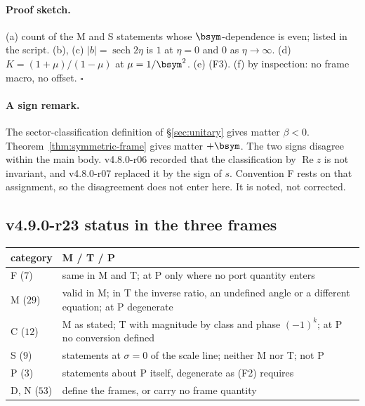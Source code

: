 \paragraph{Proof sketch.}
(a) count of the M and S statements whose \(\bsym\)-dependence is even; listed in the script.  (b), (c) \(|b|=\operatorname{sech}2\eta\) is \(1\) at
\(\eta=0\) and \(0\) as \(\eta\to\infty\).  (d) \(K=(1+\mu)/(1-\mu)\) at \(\mu=1/\bsym^2\).  (e) (F3).  (f) by inspection: no frame macro, no
offset.  \(\square\)

\paragraph{A sign remark.}
The sector-classification definition of \S\ref{sec:unitary} gives matter \(\beta<0\).  Theorem~\ref{thm:symmetric-frame} gives matter
\(+\bsym\).  The two signs disagree within the main body.  v4.8.0-r06 recorded that the classification by \(\operatorname{Re}z\) is not
invariant, and v4.8.0-r07 replaced it by the sign of \(s\).  Convention F rests on that assignment, so the disagreement does not
enter here.  It is noted, not corrected.

\subsection*{v4.9.0-r23 status in the three frames}
\label{subsec:v490-r23-frames}

\begin{center}
\small
\begin{tabular}{@{}>{\raggedright\arraybackslash}p{}>{\raggedright\arraybackslash}p{}@{}}
\toprule
category & M / T / P\\
\midrule
F (\(7\)) & same in M and T; at P only where no port quantity enters\\
M (\(29\)) & valid in M; in T the inverse ratio, an undefined angle or a different equation; at P degenerate\\
C (\(12\)) & M as stated; T with magnitude by class and phase \((-1)^k\); at P no conversion defined\\
S (\(9\)) & statements at \(\sigma=0\) of the scale line; neither M nor T; not P\\
P (\(3\)) & statements about P itself, degenerate as (F2) requires\\
D, N (\(53\)) & define the frames, or carry no frame quantity\\
\bottomrule
\end{tabular}
\end{center}

